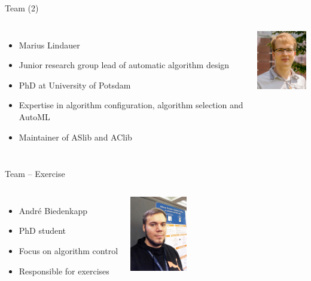 \begin{frame}[c]{Team (2)}

\begin{columns}[T]
\begin{itemize}
  \item Marius Lindauer
  \item Junior research group lead of automatic algorithm design
  \item PhD at University of Potsdam
  \item Expertise in algorithm configuration, algorithm selection and AutoML
  \item Maintainer of ASlib and AClib
\end{itemize}

\includegraphics[width=6.7em]{images/team/marius}
\end{columns}

\end{frame}
\begin{frame}[c]{Team -- Exercise}

\begin{columns}[T]
\begin{itemize}
  \item Andr\'e Biedenkapp
  \item PhD student
  \item Focus on algorithm control
  \item Responsible for exercises
\end{itemize}

\includegraphics[width=6.7em]{images/team/biedenkapp}
\end{columns}

\end{frame}
